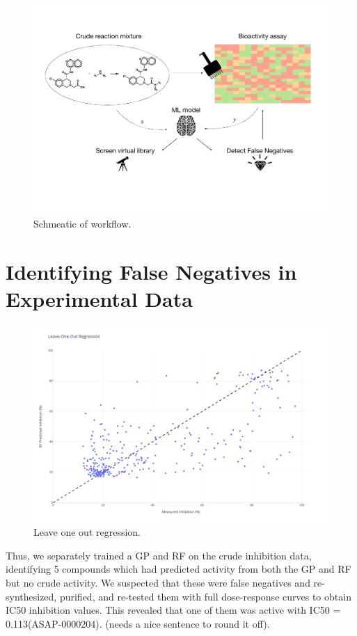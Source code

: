\begin{figure}
    \centering
             \includegraphics[width=\textwidth]{Chapters/Crude/Figs/schematic.pdf}
        \caption{Schmeatic of workflow.}
        \label{fig:schematic}
    \end{figure}

\section{Identifying False Negatives in Experimental Data}
\begin{figure}
    \centering
             \includegraphics[width=\textwidth]{Chapters/Crude/Figs/rf.pdf}
        \caption{Leave one out regression. }
        \label{fig:leave-one-out}
    \end{figure}

Thus, we separately trained a GP and RF on the crude inhibition data, identifying 5 compounds which had predicted activity from both the GP and RF but no crude activity. We suspected that these were false negatives and re-synthesized, purified, and re-tested them with full dose-response curves to obtain IC50 inhibition values. This revealed that one of them was active with IC50 = 0.113\uM (ASAP-0000204). (needs a nice sentence to round it off).

